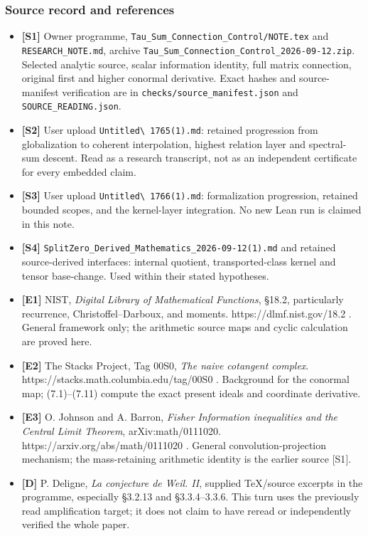 \subsubsection{Source record and
references}\label{cyclic_sum:source-record-and-references}

\begin{itemize}
\tightlist
\item
  \textbf{{[}S1{]}} Owner programme,
  \nolinkurl{Tau_Sum_Connection_Control/NOTE.tex} and
  \nolinkurl{RESEARCH_NOTE.md}, archive
  \nolinkurl{Tau_Sum_Connection_Control_2026-09-12.zip}. Selected
  analytic source, scalar information identity, full matrix connection,
  original first and higher conormal derivative. Exact hashes and
  source-manifest verification are in
  \nolinkurl{checks/source_manifest.json} and
  \nolinkurl{SOURCE_READING.json}.
\item
  \textbf{{[}S2{]}} User upload \nolinkurl{Untitled\ 1765(1).md}: retained
  progression from globalization to coherent interpolation, highest
  relation layer and spectral-sum descent. Read as a research
  transcript, not as an independent certificate for every embedded
  claim.
\item
  \textbf{{[}S3{]}} User upload \nolinkurl{Untitled\ 1766(1).md}:
  formalization progression, retained bounded scopes, and the
  kernel-layer integration. No new Lean run is claimed in this note.
\item
  \textbf{{[}S4{]}}
  \nolinkurl{SplitZero_Derived_Mathematics_2026-09-12(1).md} and
  retained source-derived interfaces: internal quotient,
  transported-class kernel and tensor base-change. Used within their
  stated hypotheses.
\item
  \textbf{{[}E1{]}} NIST, \emph{Digital Library of Mathematical
  Functions}, §18.2, particularly recurrence, Christoffel--Darboux, and
  moments. https://dlmf.nist.gov/18.2 . General framework only; the
  arithmetic source maps and cyclic calculation are proved here.
\item
  \textbf{{[}E2{]}} The Stacks Project, Tag 00S0, \emph{The naive
  cotangent complex}. https://stacks.math.columbia.edu/tag/00S0 .
  Background for the conormal map; (7.1)--(7.11) compute the exact
  present ideals and coordinate derivative.
\item
  \textbf{{[}E3{]}} O. Johnson and A. Barron, \emph{Fisher Information
  inequalities and the Central Limit Theorem}, arXiv:math/0111020.
  https://arxiv.org/abs/math/0111020 . General convolution-projection
  mechanism; the mass-retaining arithmetic identity is the earlier
  source {[}S1{]}.
\item
  \textbf{{[}D{]}} P. Deligne, \emph{La conjecture de Weil. II},
  supplied TeX/source excerpts in the programme, especially §3.2.13 and
  §3.3.4--3.3.6. This turn uses the previously read amplification
  target; it does not claim to have reread or independently verified the
  whole paper.
\end{itemize}

